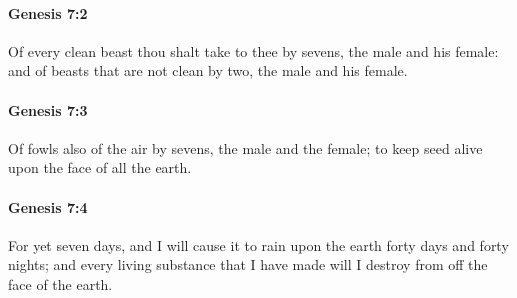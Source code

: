 		\paragraph{Genesis 7:2} %
			\label{GENESIS-7-2}

			Of every clean beast thou shalt take to thee by sevens, the male and his female: and of beasts that are not clean by two, the male and his female.


		\paragraph{Genesis 7:3} %
			\label{GENESIS-7-3}

			Of fowls also of the air by sevens, the male and the female; to keep seed alive upon the face of all the earth.


		\paragraph{Genesis 7:4} %
			\label{GENESIS-7-4}

			For yet seven days, and I will cause it to rain upon the earth forty days and forty nights; and every living substance that I have made will I destroy from off the face of the earth.


